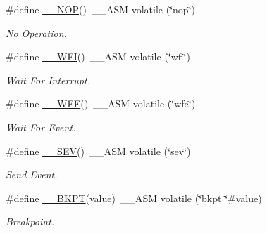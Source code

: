 \begin{DoxyCompactItemize}
\item 
\#define \mbox{\hyperlink{group___c_m_s_i_s___core___instruction_interface_ga0b13f3617dd4af2cd2eb3a311073f717}{\+\_\+\+\_\+\+N\+OP}}()~\+\_\+\+\_\+\+A\+SM volatile (\char`\"{}nop\char`\"{})
\begin{DoxyCompactList}\small\item\em No Operation. \end{DoxyCompactList}\item 
\#define \mbox{\hyperlink{group___c_m_s_i_s___core___instruction_interface_gab28e2b328c4cf23c917ab18a23194f8e}{\+\_\+\+\_\+\+W\+FI}}()~\+\_\+\+\_\+\+A\+SM volatile (\char`\"{}wfi\char`\"{})
\begin{DoxyCompactList}\small\item\em Wait For Interrupt. \end{DoxyCompactList}\item 
\#define \mbox{\hyperlink{group___c_m_s_i_s___core___instruction_interface_gaf0330712223f4cfb6091e4ab84775f73}{\+\_\+\+\_\+\+W\+FE}}()~\+\_\+\+\_\+\+A\+SM volatile (\char`\"{}wfe\char`\"{})
\begin{DoxyCompactList}\small\item\em Wait For Event. \end{DoxyCompactList}\item 
\#define \mbox{\hyperlink{group___c_m_s_i_s___core___instruction_interface_gafa58e60fcd2176ad58f96947466ea1fa}{\+\_\+\+\_\+\+S\+EV}}()~\+\_\+\+\_\+\+A\+SM volatile (\char`\"{}sev\char`\"{})
\begin{DoxyCompactList}\small\item\em Send Event. \end{DoxyCompactList}\item 
\#define \mbox{\hyperlink{group___c_m_s_i_s___core___instruction_interface_ga15ea6bd3c507d3e81c3b3a1258e46397}{\+\_\+\+\_\+\+B\+K\+PT}}(value)~\+\_\+\+\_\+\+A\+SM volatile (\char`\"{}bkpt \char`\"{}\#value)
\begin{DoxyCompactList}\small\item\em Breakpoint. \end{DoxyCompactList}\end{DoxyCompactItemize}
